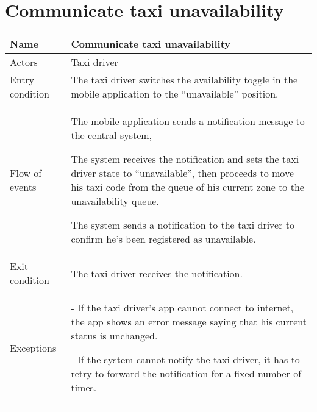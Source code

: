 \section{Communicate taxi unavailability}
\begin{center}
\begin{longtable}{|l| p{9cm}|}
\hline
Name &
Communicate taxi unavailability \\
\hline
Actors &
Taxi driver \\
\hline
Entry condition & 
The taxi driver switches the availability toggle in the mobile application to the ``unavailable'' position. \\
\hline
Flow of events & 
The mobile application sends a notification message to the central system, 

The system receives the notification and sets the taxi driver state to ``unavailable'', then proceeds to move his taxi code from the queue of his current zone to the unavailability queue.

The system sends a notification to the taxi driver to confirm he's been registered as unavailable. \\
\hline
Exit condition &
The taxi driver receives the notification. \\
\hline
Exceptions &
- If the taxi driver's app cannot connect to internet, the app shows an error message saying that his current status is unchanged.

- If the system cannot notify the taxi driver, it has to retry to forward the notification for a fixed number of times. \\
\hline
\end{longtable}
\end{center}


